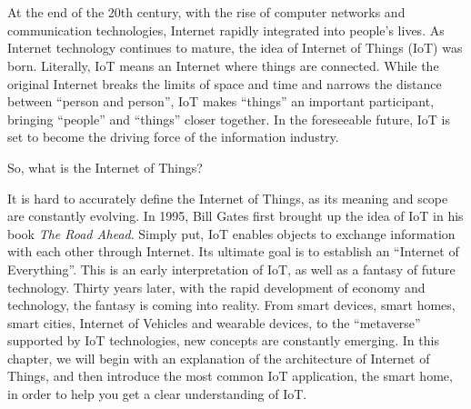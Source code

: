 \documentclass[a4paper,12pt]{book}
\begin{document}
{\makeatletter
\let\ps@plain\ps@empty
\makeatother
\part[Preparation]{\setcounter{page}{1}}
}


\chapter[Introduction to IoT]{}

\vspace{24pt}
At the end of the 20th century, with the rise of computer networks and communication technologies, Internet rapidly integrated into people's lives. As Internet technology continues to mature, the idea of Internet of Things (IoT) was born. Literally, IoT means an Internet where things are connected. While the original Internet breaks the limits of space and time and narrows the distance between “person and person”, IoT makes “things” an important participant, bringing “people” and “things” closer together. In the foreseeable future, IoT is set to become the driving force of the information industry.

So, what is the Internet of Things?

It is hard to accurately define the Internet of Things, as its meaning and scope are constantly evolving. In 1995, Bill Gates first brought up the idea of IoT in his book \textit{The Road Ahead}. Simply put, IoT enables objects to exchange information with each other through Internet. Its ultimate goal is to establish an “Internet of Everything”. This is an early interpretation of IoT, as well as a fantasy of future technology. Thirty years later, with the rapid development of economy and technology, the fantasy is coming into reality. From smart devices, smart homes, smart cities, Internet of Vehicles and wearable devices, to the “metaverse” supported by IoT technologies, new concepts are constantly emerging. In this chapter, we will begin with an explanation of the architecture of Internet of Things, and then introduce the most common IoT application, the smart home, in order to help you get a clear understanding of IoT.
\end{document}
